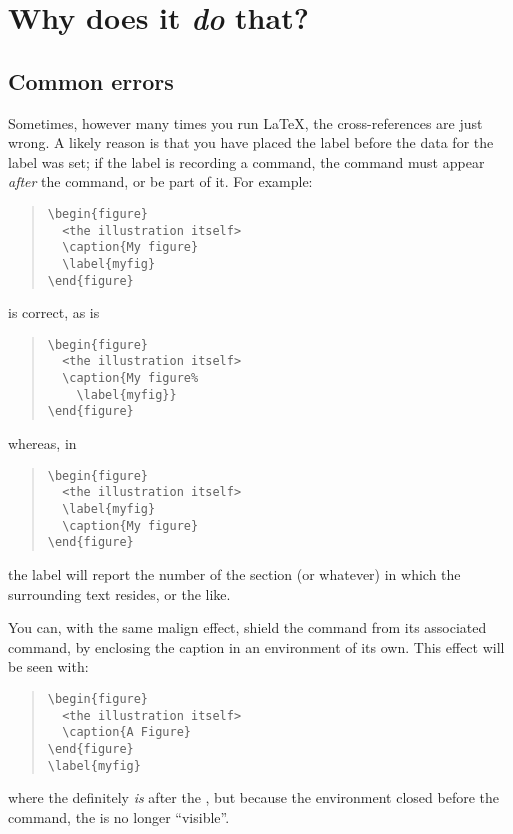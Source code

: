 
\section{Why does it \emph{do} that?}

\subsection{Common errors}


Sometimes, however many times you run \LaTeX{}, the cross-references
are just wrong.  A likely reason is that you have placed the label
before the data for the label was set; if the label is recording a
 command, the  command must appear
\emph{after} the  command, or be part of it. For example:
\begin{quote}
\begin{verbatim}
\begin{figure}
  <the illustration itself>
  \caption{My figure}
  \label{myfig}
\end{figure}
\end{verbatim}
\end{quote}
is correct, as is
\begin{quote}
\begin{verbatim}
\begin{figure}
  <the illustration itself>
  \caption{My figure%
    \label{myfig}}
\end{figure}
\end{verbatim}
\end{quote}
whereas, in
\begin{quote}
\begin{verbatim}
\begin{figure}
  <the illustration itself>
  \label{myfig}
  \caption{My figure}
\end{figure}
\end{verbatim}
\end{quote}
the label will report the number of the section (or whatever) in which
the surrounding text resides, or the like.

You can, with the same malign effect, shield the  command
from its associated  command, by enclosing the caption in an
environment of its own.  This effect will be seen with:
\begin{quote}
\begin{verbatim}
\begin{figure}
  <the illustration itself>
  \caption{A Figure}
\end{figure}
\label{myfig}
\end{verbatim}
\end{quote}
where the  definitely \emph{is} after the ,
but because the  environment closed before the
 command, the  is no longer ``visible''.

